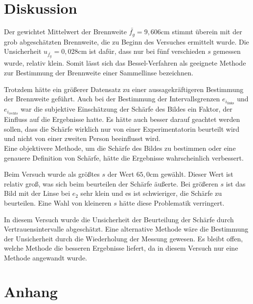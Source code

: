 \documentclass[a4paper,12pt]{article}
\begin{document}
\section{Diskussion}

Der gewichtet Mittelwert der Brennweite $\bar{f_g} = 9,606\mathrm{cm}$ stimmt überein mit der grob abgeschätzten
Brennweite, die zu Beginn des Versuches ermittelt wurde. Die Unsicherheit $u_{\bar{f_g}} = 0,028\mathrm{cm}$ ist
dafür, dass nur bei fünf verschieden $s$ gemessen wurde, relativ klein.
Somit lässt sich das Bessel-Verfahren als geeignete Methode zur Bestimmung der Brennweite einer Sammellinse
bezeichnen.

Trotzdem hätte ein größerer Datensatz zu einer aussagekräftigeren Bestimmung der Brennweite geführt.
Auch bei der Bestimmung der Intervallsgrenzen $e_{i_\mathrm{links}}$ und $e_{i_\mathrm{rechts}}$ war
die subjektive Einschätzung der Schärfe des Bildes ein Faktor, der Einfluss auf die Ergebnisse hatte.
Es hätte auch besser darauf geachtet werden sollen, dass die Schärfe wirklich nur von einer
Experimentatorin beurteilt wird und nicht von einer zweiten Person beeinflusst wird.\\
Eine objektivere Methode, um die Schärfe des Bildes zu bestimmen oder eine genauere Definition von
Schärfe, hätte die Ergebnisse wahrscheinlich verbessert.

Beim Versuch wurde als größtes $s$ der Wert $65,0\mathrm{cm}$ gewählt. Dieser Wert ist relativ groß,
was sich beim beurteilen der Schärfe äußerte. Bei größeren $s$ ist das Bild mit der Linse bei $e_2$
sehr klein und es ist schwieriger, die Schärfe zu beurteilen. Eine Wahl von kleineren $s$ hätte
diese Problematik verringert.

In diesem Versuch wurde die Unsicherheit der Beurteilung der Schärfe durch Vertrauensintervalle
abgeschätzt. Eine alternative Methode wäre die Bestimmung der Unsicherheit durch die Wiederholung
der Messung gewesen. Es bleibt offen, welche Methode die besseren Ergebnisse liefert, da in diesem
Versuch nur eine Methode angewandt wurde.


\newpage

\section{Anhang}
\label{sec:Anhang}
\end{document}

